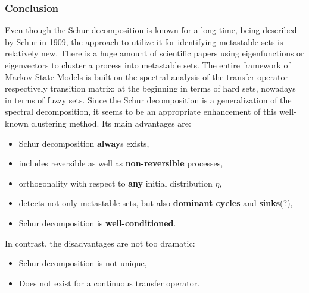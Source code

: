 \subsubsection*{Conclusion}

Even though the Schur decomposition is known for a long time, being described by Schur\cite{schur1909characteristic} in 1909, the approach to utilize it for identifying metastable sets is relatively new. %
There is a huge amount of scientific papers using eigenfunctions or eigenvectors to cluster a process into metastable sets. The entire framework of Markov State Models is built on the spectral analysis of the transfer operator respectively transition matrix; at the beginning in terms of hard sets, nowadays in terms of fuzzy sets.
Since the Schur decomposition is a generalization of the spectral decomposition, it seems to be an appropriate enhancement of this well-known clustering method.
Its main advantages are:
\begin{itemize}
	\item Schur decomposition \textbf{alway}s exists, %
	\item includes reversible as well as \textbf{non-reversible} processes,
	\item orthogonality with respect to \textbf{any} initial distribution $\eta$, %
	\item detects not only metastable sets, but also \textbf{dominant cycles} and \textbf{sinks}(?), %
	\item Schur decomposition is \textbf{well-conditioned}.
\end{itemize}
In contrast, the disadvantages are not too dramatic:
\begin{itemize}
	\item Schur decomposition is not unique, 
	\item Does not exist for a continuous transfer operator.
\end{itemize}

